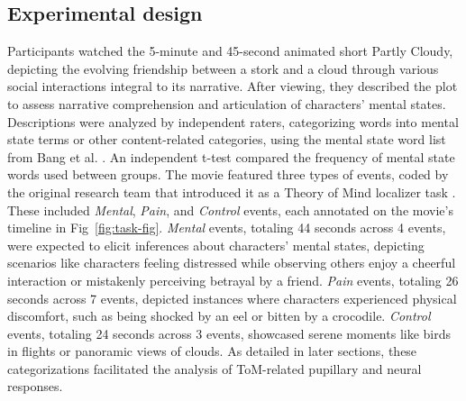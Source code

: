 \subsection{Experimental design }
Participants watched the 5-minute and 45-second animated short Partly Cloudy, depicting the evolving friendship between a stork and a cloud through various social interactions integral to its narrative. After viewing, they described the plot to assess narrative comprehension and articulation of characters' mental states. Descriptions were analyzed by independent raters, categorizing words into mental state terms or other content-related categories, using the mental state word list from Bang et al. \citep{bang2013}. An independent t-test compared the frequency of mental state words used between groups. The movie featured three types of events, coded by the original research team that introduced it as a Theory of Mind localizer task \citep{jacoby2016}. These included \textit{Mental}, \textit{Pain}, and \textit{Control} events, each annotated on the movie's timeline in Fig~\ref{fig:task-fig}. \textit{Mental} events, totaling 44 seconds across 4 events, were expected to elicit inferences about characters' mental states, depicting scenarios like characters feeling distressed while observing others enjoy a cheerful interaction or mistakenly perceiving betrayal by a friend. \textit{Pain} events, totaling 26 seconds across 7 events, depicted instances where characters experienced physical discomfort, such as being shocked by an eel or bitten by a crocodile. \textit{Control} events, totaling 24 seconds across 3 events, showcased serene moments like birds in flights or panoramic views of clouds. As detailed in later sections, these categorizations facilitated the analysis of ToM-related pupillary and neural responses.



